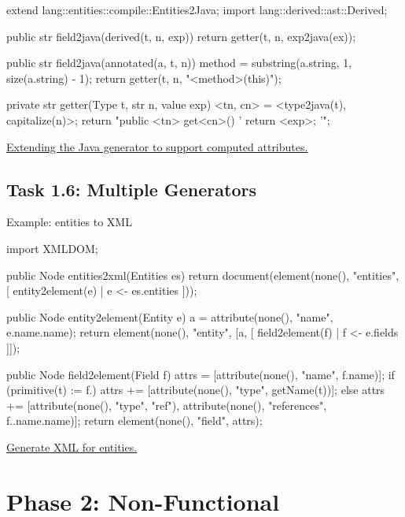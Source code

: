 \documentclass[a4paper]{article}
\def\source#1#2{\href{http://svn.rascal-mpl.org/lwc/trunk/lwc11/src/#1}{#2}}
\begin{document}
\begin{listing}
\begin{rascal}
extend lang::entities::compile::Entities2Java;
import lang::derived::ast::Derived;

public str field2java(derived(t, n, exp)) {
    return getter(t, n, exp2java(ex));
}

public str field2java(annotated(a, t, n)) {
    method = substring(a.string, 1, size(a.string) - 1);
    return getter(t, n, "<method>(this)");
}

private str getter(Type t, str n, value exp) {
    <tn, cn> = <type2java(t), capitalize(n)>;
    return "public <tn> get<cn>() {
           '    return <exp>;
           '}";
}
\end{rascal}
\caption{\source{lang/derived/compile/Derived2Java.rsc}{Extending the
    Java generator to support computed
    attributes.}\label{LST:derived2java}}
\end{listing}



\subsection*{Task 1.6: Multiple Generators}

Example: entities to XML

\begin{listing}
\begin{rascal}
import XMLDOM;

public Node entities2xml(Entities es) {
    return document(element(none(), "entities", 
       [ entity2element(e) | e <- es.entities ]));
}

public Node entity2element(Entity e) {
    a = attribute(none(), "name", e.name.name);
    return element(none(), "entity", 
       [a, [ field2element(f) | f <- e.fields ]]); 
}

public Node field2element(Field f) {
    attrs = [attribute(none(), "name", f.name)];
    if (primitive(t) := f.\type) {
        attrs += [attribute(none(), "type", getName(t))];
    }
    else {
        attrs += [attribute(none(), "type", "ref"),
                    attribute(none(), "references", f.\type.name.name)];
    }
    return element(none(), "field", attrs); 
}
\end{rascal}
\caption{\source{lang/entities/compile/Derived2XML.rsc}{Generate XML
    for entities.}\label{LST:entities2xml}}
\end{listing}

\section*{Phase 2: Non-Functional}
\end{document}
